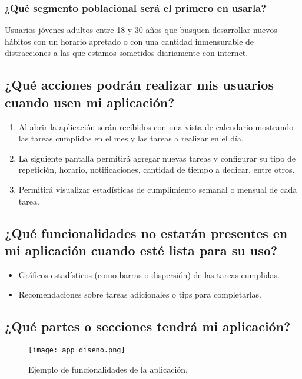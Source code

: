 \documentclass[11pt]{scrartcl} %
\begin{document}
\subsubsection{¿Qué segmento poblacional será el primero en usarla?}

Usuarios jóvenes-adultos entre 18 y 30 años que busquen desarrollar nuevos hábitos con un horario apretado o con una cantidad inmensurable de distracciones a las que estamos sometidos diariamente con internet.

\subsection{¿Qué acciones podrán realizar mis usuarios cuando usen mi aplicación?}

\begin{enumerate}
	\item Al abrir la aplicación serán recibidos con una vista de calendario mostrando las tareas cumplidas en el mes y las tareas a realizar en el día.
	\item La siguiente pantalla permitirá agregar nuevas tareas y configurar su tipo de repetición, horario, notificaciones, cantidad de tiempo a dedicar, entre otros.
	\item Permitirá visualizar estadísticas de cumplimiento semanal o mensual de cada tarea.
\end{enumerate}

\subsection{¿Qué funcionalidades no estarán presentes en mi aplicación cuando esté lista para su uso?}

\begin{itemize}
	\item Gráficos estadísticos (como barras o dispersión) de las tareas cumplidas.
	\item Recomendaciones sobre tareas adicionales o tips para completarlas.
\end{itemize}

\subsection{¿Qué partes o secciones tendrá mi aplicación?}

\begin{figure}[h] %
	\centering
	\texttt{[image: app\_diseno.png]} %
	\caption{Ejemplo de funcionalidades de la aplicación.}
\end{figure}
\end{document}
